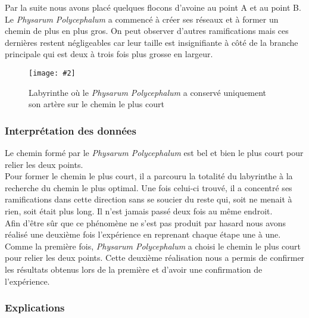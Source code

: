 \documentclass[]{report}
\newcommand{\includeimage}[2][]{%
\imgsrc{#2}
\begin{latexonly}
    \texttt{[image: \#2]}
\end{latexonly}
}
\theoremstyle{definition}
\begin{document}
{Par la suite nous avons placé quelques flocons d’avoine au point A et au point B. Le \textit{Physarum Polycephalum} a commencé à créer ses réseaux et à former un chemin de plus en plus gros. On peut observer d’autres ramifications mais ces dernières restent négligeables car leur taille est insignifiante à côté de la branche principale qui est deux à trois fois plus grosse en largeur. }

\begin{figure}[H]
    \centering
    \includeimage[height=5cm]{laby3.png}
    \caption{Labyrinthe où le \textit{Physarum Polycephalum} a conservé uniquement son artère sur le chemin le plus court}
\end{figure}

\subsubsection{Interprétation des données}

{Le chemin formé par le \textit{Physarum Polycephalum} est bel et bien le plus court pour relier les deux points.}\\
{Pour former le chemin le plus court, il a parcouru la totalité du labyrinthe à la recherche du chemin le plus optimal. Une fois celui-ci trouvé, il a concentré ses ramifications dans cette direction sans se soucier du reste qui, soit ne menait à rien, soit était plus long. Il n’est jamais passé deux fois au même endroit.}\\
{Afin d’être sûr que ce phénomène ne s’est pas produit par hasard nous avons réalisé une deuxième fois l’expérience en reprenant chaque étape une à une. Comme la première fois, \textit{Physarum Polycephalum} a choisi le chemin le plus court pour relier les deux points.
Cette deuxième réalisation nous a permis de confirmer les résultats obtenus lors de la première et d’avoir une confirmation de l’expérience.}

\subsubsection{Explications}
\end{document}
